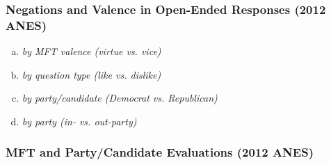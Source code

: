 \documentclass[12pt]{article}
\begin{document}
\subsubsection*{Negations and Valence in Open-Ended Responses (2012 ANES)}
\vspace{2em}
\begin{enumerate}[a)]
\item \textit{by MFT valence (virtue vs. vice)}


\clearpage
\item \textit{by question type (like vs. dislike)}


\clearpage
\item \textit{by party/candidate (Democrat vs. Republican)}


\clearpage
\item \textit{by party (in- vs. out-party)}


\end{enumerate}

\clearpage
\subsubsection*{MFT and Party/Candidate Evaluations (2012 ANES)}


\clearpage


\end{document}
